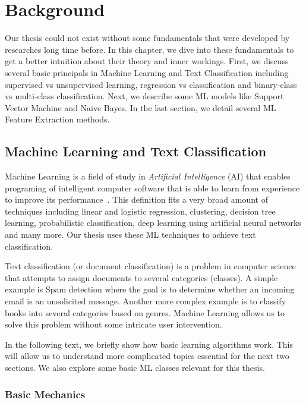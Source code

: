\chapter{Background}

Our thesis could not exist without some fundamentals that were developed by researches long time before. In this chapter, we dive into these fundamentals to get a better intuition about their theory and inner workings. First, we discuss several basic principals in Machine Learning and Text Classification including supervised vs unsupervised learning, regression vs classification and binary-class vs multi-class classification. Next, we describe some ML models like Support Vector Machine and Naive Bayes. In the last section, we detail several ML Feature Extraction methods.

\section{Machine Learning and Text Classification}

Machine Learning is a field of study in \textit{Artificial Intelligence} (AI) that enables programing of intelligent computer software that is able to learn from experience to improve its performance~\cite{Samuel1959}. This definition fits a very broad amount of techniques including linear and logistic regression, clustering, decision tree learning, probabilistic classification, deep learning using artificial neural networks and many more. Our thesis uses these ML techniques to achieve text classification.

Text classification (or document classification) is a problem in computer science that attempts to assign documents to several categories (classes). A simple example is Spam detection where the goal is to determine whether an incoming email is an unsolicited message. Another more complex example is to classify books into several categories based on genres. Machine Learning allows us to solve this problem without some intricate user intervention.

In the following text, we briefly show how basic learning algorithms work. This will allow us to understand more complicated topics essential for the next two sections. We also explore some basic ML classes relevant for this thesis.

\subsection{Basic Mechanics}

